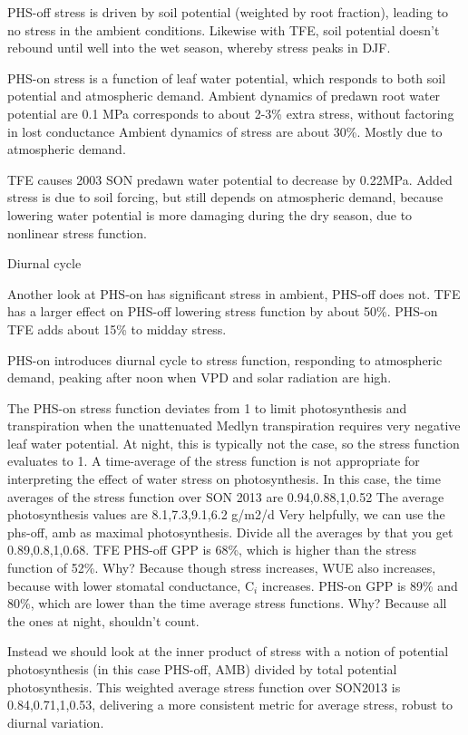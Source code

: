 \documentclass[draft,linenumbers]{agujournal}
\begin{document}
PHS-off stress is driven by soil potential (weighted by root fraction), leading to no stress in the ambient conditions.
Likewise with TFE, soil potential doesn't rebound until well into the wet season, whereby stress peaks in DJF.

PHS-on stress is a function of leaf water potential, which responds to both soil potential and atmospheric demand. 
Ambient dynamics of predawn root water potential are 0.1 MPa corresponds to about 2-3\% extra stress, without factoring in lost conductance
Ambient dynamics of stress are about 30\%. Mostly due to atmospheric demand.

TFE causes 2003 SON predawn water potential to decrease by 0.22MPa. 
Added stress is due to soil forcing, but still depends on atmospheric demand, 
because lowering water potential is more damaging during the dry season,
due to nonlinear stress function.

Diurnal cycle

Another look at PHS-on has significant stress in ambient, PHS-off does not.
TFE has a larger effect on PHS-off lowering stress function by about 50\%.
PHS-on TFE adds about 15\% to midday stress.

PHS-on introduces diurnal cycle to stress function, responding to atmospheric demand, peaking after noon
when VPD and solar radiation are high. 

The PHS-on stress function deviates from 1 to limit photosynthesis and transpiration when the unattenuated Medlyn transpiration requires
very negative leaf water potential. At night, this is typically not the case, so the stress function evaluates to 1. 
A time-average of the stress function is not appropriate for interpreting the effect of water stress on photosynthesis.
In this case, the time averages of the stress function over SON 2013 are 0.94,0.88,1,0.52
The average photosynthesis values are 8.1,7.3,9.1,6.2 g/m2/d
Very helpfully, we can use the phs-off, amb as maximal photosynthesis. Divide all the averages by that you get
0.89,0.8,1,0.68.
TFE PHS-off GPP is 68\%, which is higher than the stress function of 52\%.
Why? Because though stress increases, WUE also increases, because with lower stomatal conductance, C$_i$ increases.
PHS-on GPP is 89\% and 80\%, which are lower than the time average stress functions.
Why? Because all the ones at night, shouldn't count.

Instead we should look at the inner product of stress with a notion of potential photosynthesis (in this case PHS-off, AMB) divided by total potential photosynthesis.
This weighted average stress function over SON2013 is 0.84,0.71,1,0.53, delivering a more consistent metric for average stress, robust to diurnal variation.
\end{document}
